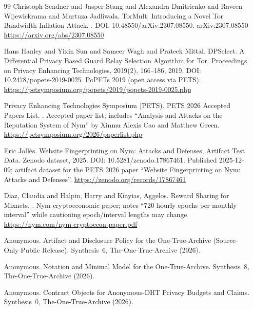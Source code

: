 \documentclass[11pt]{article}
\begin{document}
\begin{thebibliography}{99}
Christoph Sendner and Jasper Stang and Alexandra Dmitrienko and Raveen Wijewickrama and Murtuza Jadliwala.
\newblock TorMult: Introducing a Novel {Tor} Bandwidth Inflation Attack.
.
\newblock DOI: 10.48550/arXiv.2307.08550.
\newblock arXiv:2307.08550
\newblock \url{https://arxiv.org/abs/2307.08550}

Hans Hanley and Yixin Sun and Sameer Wagh and Prateek Mittal.
\newblock DPSelect: A Differential Privacy Based Guard Relay Selection Algorithm for Tor.
\newblock Proceedings on Privacy Enhancing Technologies, 2019(2), 166--186, 2019.
\newblock DOI: 10.2478/popets-2019-0025.
\newblock PoPETs 2019 (open access via PETS).
\newblock \url{https://petsymposium.org/popets/2019/popets-2019-0025.php}

{Privacy Enhancing Technologies Symposium (PETS)}.
\newblock PETS 2026 Accepted Papers List.
.
\newblock Accepted paper list; includes ``Analysis and Attacks on the Reputation System of Nym'' by Xinmu Alexis Cao and Matthew Green.
\newblock \url{https://petsymposium.org/2026/paperlist.php}

Eric Joll{\`e}s.
\newblock Website Fingerprinting on {Nym}: Attacks and Defenses, Artifact Test Data.
\newblock Zenodo dataset, 2025.
\newblock DOI: 10.5281/zenodo.17867461.
\newblock Published 2025-12-09; artifact dataset for the PETS 2026 paper ``Website Fingerprinting on Nym: Attacks and Defenses''.
\newblock \url{https://zenodo.org/records/17867461}

Diaz, Claudia and Halpin, Harry and Kiayias, Aggelos.
\newblock Reward Sharing for Mixnets.
.
\newblock Nym cryptoeconomic paper; notes ``720 hourly epochs per monthly interval'' while cautioning epoch/interval lengths may change.
\newblock \url{https://nym.com/nym-cryptoecon-paper.pdf}


Anonymous.
\newblock Artifact and Disclosure Policy for the One-True-Archive (Source-Only Public Release).
\newblock Synthesis~6, The-One-True-Archive (2026).

Anonymous.
\newblock Notation and Minimal Model for the One-True-Archive.
\newblock Synthesis~8, The-One-True-Archive (2026).

Anonymous.
\newblock Contract Objects for Anonymous-DHT Privacy Budgets and Claims.
\newblock Synthesis~0, The-One-True-Archive (2026).


\end{thebibliography}
\end{document}
